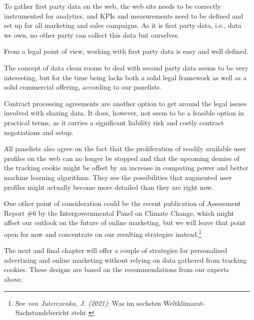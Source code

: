 To gather first party data on the web, the web site needs to be correctly instrumented for analytics, and KPIs and measurements need to be defined and set up for all marketing and sales campaigns. As it is first party data, i.e., data we own, no other party can collect this data but ourselves.

From a legal point of view, working with first party data is easy and well defined.

The concept of data clean rooms to deal with second party data seems to be very interesting, but for the time being lacks both a solid legal framework as well as a solid commercial offering, according to our panelists.

Contract processing agreements are another option to get around the legal issues involved with sharing data. It does, however, not seem to be a feasible option in practical terms, as it carries a significant liability risk and costly contract negotiations and setup.

All panelists also agree on the fact that the proliferation of readily available user profiles on the web can no longer be stopped and that the upcoming demise of the tracking cookie might be offset by an increase in computing power and better machine learning algorithms. They see the possibilities that augmented user profiles might actually become more detailed than they are right now.

One other point of consideration could be the recent publication of Assessment Report \#6 by the Intergovernmental Panel on Climate Change, which might affect our outlook on the future of online marketing, but we will leave that point open for now and concentrate on our resulting strategies instead.\footnote{See \textit{von Juterczenka, J. (2021)}: Was im sechsten Weltklimarat-Sachstandsbericht steht \cite{ipccAr6}}

The next and final chapter will offer a couple of strategies for personalized advertising and online marketing without relying on data gathered from tracking cookies. These designs are based on the recommendations from our experts above.
